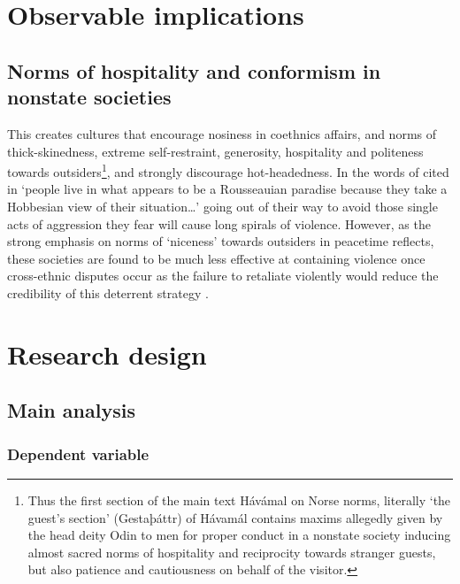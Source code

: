 \documentclass[12pt]{article}
\begin{document}
\section{Observable implications}


\subsection{Norms of hospitality and conformism in nonstate societies}

This creates cultures that encourage nosiness in coethnics affairs, and norms of
thick-skinedness, extreme self-restraint, generosity, hospitality and politeness
towards outsiders\footnote{Thus the first section of the main text Hávámal on
	Norse norms, literally ‘the guest’s section’ (Gestaþáttr) of Hávamál
	contains maxims allegedly given by the head deity Odin to men for proper
	conduct in a nonstate society inducing almost sacred norms of
	hospitality and reciprocity towards stranger guests, but also patience
	and cautiousness on behalf of the visitor.}, and strongly discourage
hot-headedness. In the words of \citet[37]{Colson1974} cited in
\citep[199]{Cohen2004} ‘people live in what appears to be a Rousseauian
paradise because they take a Hobbesian view of their situation…’ going out of
their way to avoid those single acts of aggression they fear will cause long
spirals of violence. However, as the strong emphasis on norms of ‘niceness’
towards outsiders in peacetime reflects, these societies are found to be much
less effective at containing violence once cross-ethnic disputes occur as the
failure to retaliate violently would reduce the credibility of this deterrent
strategy \citep[723f]{Fearon_1996}.

\section{Research design}
\subsection{Main analysis}

\subsubsection{Dependent variable}
\end{document}
